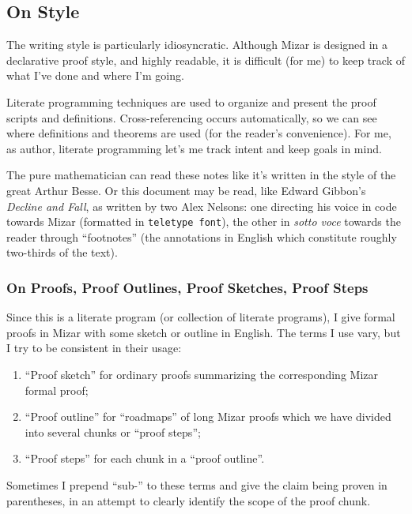 
\subsection*{On Style}
The writing style is particularly idiosyncratic. Although Mizar is
designed in a declarative proof style, and highly readable, it is
difficult (for me) to keep track of what I've done and where I'm going.

Literate programming techniques are used to organize and present the
proof scripts and definitions. Cross-referencing occurs automatically,
so we can see where definitions and theorems are used (for the reader's
convenience). For me, as author, literate programming let's me track
intent and keep goals in mind.

The pure mathematician can read these notes like it's written in the
style of the great Arthur Besse. Or this document may be read, like
Edward Gibbon's
\emph{Decline and Fall}, as written by two Alex Nelsons: one directing
his voice in code towards Mizar (formatted in \verb#teletype font#), the
other in \emph{sotto voce} towards the reader through ``footnotes'' (the
annotations in English which constitute roughly two-thirds of the text).

\subsubsection*{On Proofs, Proof Outlines, Proof Sketches, Proof Steps}
Since this is a literate program (or collection of literate programs), I
give formal proofs in Mizar with some sketch or outline in English. The
terms I use vary, but I try to be consistent in their usage:
\begin{enumerate}
\item ``Proof sketch'' for ordinary proofs summarizing the corresponding
Mizar formal proof;
\item ``Proof outline'' for ``roadmaps'' of long Mizar proofs which we
have divided into several chunks or ``proof steps'';
\item ``Proof steps'' for each chunk in a ``proof outline''.
\end{enumerate}
Sometimes I prepend ``sub-'' to these terms and give the claim being
proven in parentheses, in an attempt to clearly identify the scope of
the proof chunk.

